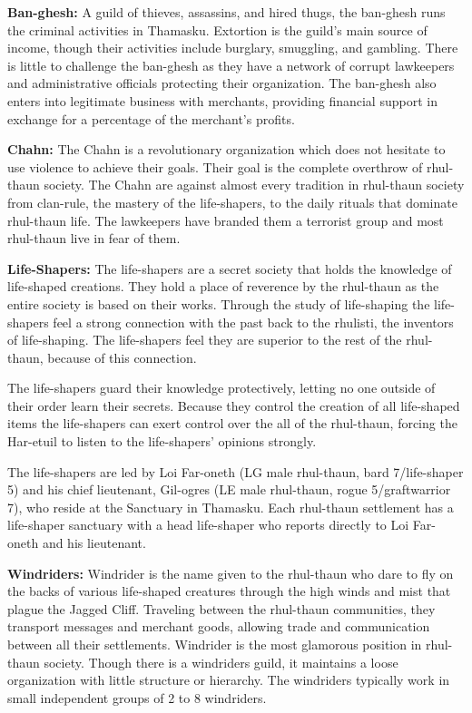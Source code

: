 {
	\textbf{Ban-ghesh:} A guild of thieves, assassins, and hired thugs, the ban-ghesh runs the criminal activities in Thamasku. Extortion is the guild's main source of income, though their activities include burglary, smuggling, and gambling. There is little to challenge the ban-ghesh as they have a network of corrupt lawkeepers and administrative officials protecting their organization. The ban-ghesh also enters into legitimate business with merchants, providing financial support in exchange for a percentage of the merchant's profits.

	\textbf{Chahn:} The Chahn is a revolutionary organization which does not hesitate to use violence to achieve their goals. Their goal is the complete overthrow of rhul-thaun society. The Chahn are against almost every tradition in rhul-thaun society from clan-rule, the mastery of the life-shapers, to the daily rituals that dominate rhul-thaun life. The lawkeepers have branded them a terrorist group and most rhul-thaun live in fear of them.

	\textbf{Life-Shapers:} The life-shapers are a secret society that holds the knowledge of life-shaped creations. They hold a place of reverence by the rhul-thaun as the entire society is based on their works. Through the study of life-shaping the life-shapers feel a strong connection with the past back to the rhulisti, the inventors of life-shaping. The life-shapers feel they are superior to the rest of the rhul-thaun, because of this connection.

	The life-shapers guard their knowledge protectively, letting no one outside of their order learn their secrets. Because they control the creation of all life-shaped items the life-shapers can exert control over the all of the rhul-thaun, forcing the Har-etuil to listen to the life-shapers' opinions strongly.

	The life-shapers are led by Loi Far-oneth (LG male rhul-thaun, bard 7/life-shaper 5) and his chief lieutenant, Gil-ogres (LE male rhul-thaun, rogue 5/graftwarrior 7), who reside at the Sanctuary in Thamasku. Each rhul-thaun settlement has a life-shaper sanctuary with a head life-shaper who reports directly to Loi Far-oneth and his lieutenant.

	\textbf{Windriders:} Windrider is the name given to the rhul-thaun who dare to fly on the backs of various life-shaped creatures through the high winds and mist that plague the Jagged Cliff. Traveling between the rhul-thaun communities, they transport messages and merchant goods, allowing trade and communication between all their settlements. Windrider is the most glamorous position in rhul-thaun society. Though there is a windriders guild, it maintains a loose organization with little structure or hierarchy. The windriders typically work in small independent groups of 2 to 8 windriders.
}
